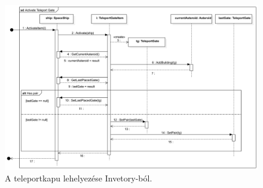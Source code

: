 \begin{figure}[H] 
\centering 
\includegraphics[width=1\textwidth]{docs/3_Project/svg/Design Model!Activate Item!Activate gate!Activate Teleport Gate_32.png} 
\caption{A teleportkapu lehelyezése Invetory-ból.} 
\end{figure} 

